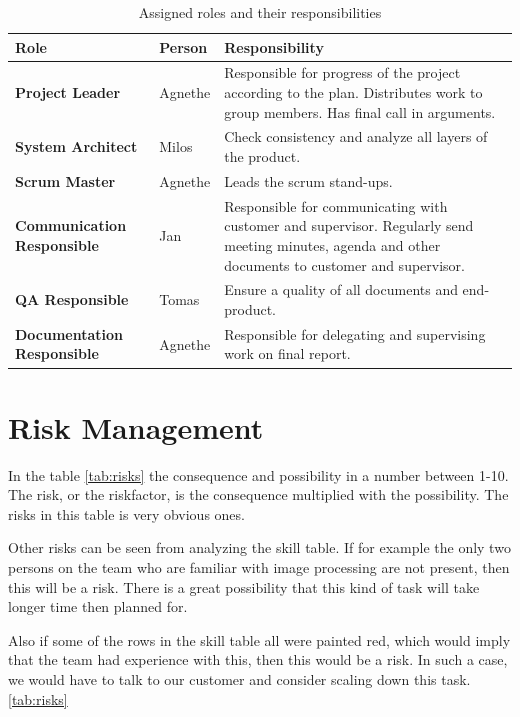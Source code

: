 \begin{table}\centering {}
    \caption{Assigned roles and their responsibilities}
    \label{tab:roles}
    \vspace{2mm}
    \begin{tabularx}{\textwidth}{llX}
    \toprule
    Role    & Person   & Responsibility \\
    \midrule
    \textbf{Project Leader}             & Agnethe &
        Responsible for progress of the project according to the plan.
        Distributes work to group members.
        Has final call in arguments.\\
    \textbf{System Architect}             & Milos &
        Check consistency and analyze all layers of the product. \\
    \textbf{Scrum Master}             & Agnethe &
        Leads the scrum stand-ups. \\
    \textbf{Communication Responsible}  & Jan &
        Responsible for communicating with customer and supervisor.
        Regularly send meeting minutes, agenda and other documents to customer and supervisor. \\ 
    \textbf{QA Responsible} & Tomas &
        Ensure a quality of all documents and end-product.        \\ 
    \textbf{Documentation Responsible} & Agnethe &
        Responsible for delegating and supervising work on final report.        \\         
    \bottomrule
    \end{tabularx}
\end{table}

\section{Risk Management}
In the table \ref{tab:risks} the consequence and possibility in a number between 1-10. The risk, or the riskfactor, is the consequence multiplied with the possibility. The risks in this table is very obvious ones. 

Other risks can be seen from analyzing the skill table. If for example the only two persons on the team who are familiar with image processing are not present, then this will be a risk. There is a great possibility that this kind of task will take longer time then planned for. 

Also if some of the rows in the skill table all were painted red, which  would imply that the team had experience with this, then this would be a risk. In such a case, we would have to talk to our customer and consider scaling down this task. 
\ref{tab:risks}

